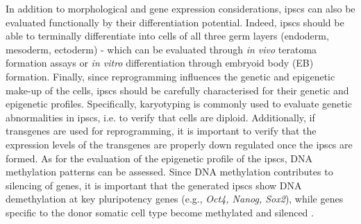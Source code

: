 In addition to morphological and gene expression considerations, \glspl{ipsc} can also be evaluated functionally by their differentiation potential.
Indeed, \glspl{ipsc} should be able to terminally differentiate into cells of all three germ layers (endoderm, mesoderm, ectoderm) - which can be evaluated through \textit{in vivo} teratoma formation assays or \textit{in vitro} differentiation through embryoid body (EB) formation.
Finally, since reprogramming influences the genetic and epigenetic make-up of the cells, \glspl{ipsc} should be carefully characterised for their genetic and epigenetic profiles.
Specifically, karyotyping is commonly used to evaluate genetic abnormalities in \glspl{ipsc}, i.e. to verify that cells are diploid. 
Additionally, if transgenes are used for reprogramming, it is important to verify that the expression levels of the transgenes are properly down regulated once the \glspl{ipsc} are formed. 
As for the evaluation of the epigenetic profile of the \glspl{ipsc}, DNA methylation patterns can be assessed. 
Since DNA methylation contributes to silencing of genes, it is important that the generated \glspl{ipsc} show DNA demethylation at key pluripotency genes (e.g., \textit{Oct4, Nanog, Sox2}), while genes specific to the donor somatic cell type become methylated and silenced \cite{brouwer2016choices, omole2018ten}. 



